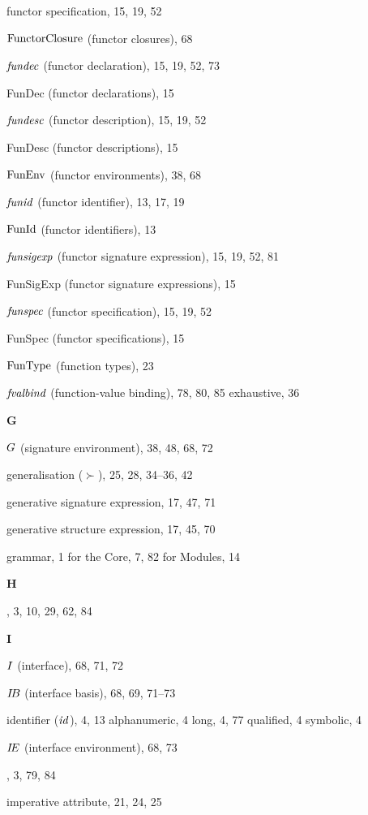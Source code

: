 \begin{theindex}
\item functor specification, 15, 19, 52
\item ${\rm FunctorClosure}$ (functor closures), 68
\item ${\it fundec}$ (functor declaration), 15, 19, 52, 73
\item FunDec (functor declarations), 15
\item ${\it fundesc}$ (functor description), 15, 19, 52
\item FunDesc (functor descriptions), 15
\item ${\rm FunEnv}$ (functor environments), 38, 68
\item ${\it funid}$ (functor identifier), 13, 17, 19
\item ${\rm FunId}$ (functor identifiers), 13
\item ${\it funsigexp}$ (functor signature expression), 15, 19, 52, 81
\item FunSigExp (functor signature expressions), 15
\item ${\it funspec}$ (functor specification), 15, 19, 52
\item FunSpec (functor specifications), 15
\item ${\rm FunType}$ (function types), 23
\item ${\it fvalbind}$ (function-value binding), 78, 80, 85
\subitem exhaustive, 36
\indexspace
\indexspace
\indexspace
\parbox{65mm}{\hfil{\large\bf G}\hfil}
\indexspace
\item $G$ (signature environment), 38, 48, 68, 72
\item generalisation ($\succ$), 25, 28, 34--36, 42
\item generative signature expression, 17, 47, 71
\item generative structure expression, 17, 45, 70
\item grammar, 1
\subitem for the Core, 7, 82
\subitem for Modules, 14
\indexspace
\parbox{65mm}{\hfil{\large\bf H}\hfil}
\indexspace
\item \HANDLE, 3, 10, 29, 62, 84
\indexspace
\parbox{65mm}{\hfil{\large\bf I}\hfil}
\indexspace
\item $I$ (interface), 68, 71, 72
\item $\mbox{$I\!B$}$ (interface basis), 68, 69, 71--73
\item identifier (${\it id}$), 4, 13
\subitem alphanumeric, 4
\subitem long, 4, 77
\subitem qualified, 4
\subitem symbolic, 4
\item $\mbox{$I\!E$}$ (interface environment), 68, 73
\item \IF, 3, 79, 84
\item imperative attribute, 21, 24, 25

\end{theindex}

